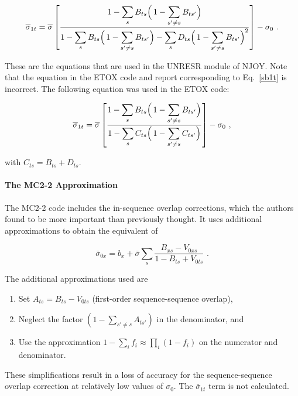 \begin{equation}
  \overline{\sigma}_{1t} = \overline{\sigma}\left[
     \frac{\displaystyle 1-\sum_s B_{ts} \Bigl(\,1-\sum_{s'\neq s}B_{ts'}\Bigr)}
    {\displaystyle 1-\sum_s B_{ts} \Bigl(\,1-\sum_{s'\neq s}B_{ts'}\Bigr)
     -\sum_s D_{ts}\Bigl(\,1-\sum_{s'\neq s}B_{ts'}\Bigr)^2}
     \right]-\sigma_0 \,\,.
\label{sb1t}
\end{equation}

\noindent
These are the equations that are used in the UNRESR module of NJOY.
Note that the equation in the ETOX code and report corresponding
to Eq.~\ref{sb1t} is incorrect.  The following equation was
used in the ETOX code:

\begin{equation}
  \overline{\sigma}_{1t} = \overline{\sigma}\left[
     \frac{\displaystyle 1-\sum_s B_{ts} \Bigl(\,1-\sum_{s'\neq s}B_{ts'}\Bigr)}
    {\displaystyle 1-\sum_s C_{ts} \Bigl(\,1-\sum_{s'\neq s}C_{ts'}\Bigr)}
     \right]-\sigma_0 \,\,,
\end{equation}

\noindent
with $C_{ts}=B_{ts}+D_{ts}$.


\paragraph{The MC2-2 Approximation}
The MC2-2 code includes the in-sequence overlap
corrections, which the authors found to be more important than previously
thought.  It uses additional approximations to obtain the equivalent of

\begin{equation}
  \overline{\sigma}_{0x} = b_x + \overline{\sigma}
    \sum_s \frac{B_{xs}-V_{0xs}}{1-B_{ts}+V_{0ts}}\,\,.
\end{equation}

\noindent
The additional approximations used are

\begin{enumerate}
\item Set $A_{ts}=B_{ts}-V_{0ts}$ (first-order sequence-sequence
overlap),
\item Neglect the factor $(1-\sum_{s'\neq s}A_{ts'})$ in the denominator, and
\item Use the approximation $1-\sum_if_i\approx\prod_i(1-f_i)$
on the numerator and denominator.
\end{enumerate}

These simplifications result in a loss of accuracy for the
sequence-sequence overlap correction at relatively low values of
$\sigma_0$.  The $\overline{\sigma}_{1t}$ term is not calculated.



